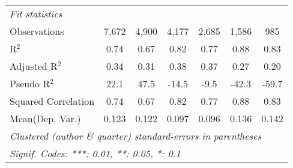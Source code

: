 \begin{tabular}{lcccccc}
   \midrule
   \emph{Fit statistics}\\
   Observations                                               & 7,672   & 4,900        & 4,177        & 2,685        & 1,586   & 985\\  
   R$^2$                                                      & 0.74    & 0.67         & 0.82         & 0.77         & 0.88    & 0.83\\  
   Adjusted R$^2$                                             & 0.34    & 0.31         & 0.38         & 0.37         & 0.27    & 0.20\\  
   Pseudo R$^2$                                               & 22.1    & 47.5         & -14.5        & -9.5         & -42.3   & -59.7\\  
   Squared Correlation                                        & 0.74    & 0.67         & 0.82         & 0.77         & 0.88    & 0.83\\  
Mean(Dep. Var.) & 0.123 & 0.122 & 0.097 & 0.096 & 0.136 & 0.142 \\
   \midrule \midrule
   \multicolumn{7}{l}{\emph{Clustered (author \& quarter) standard-errors in parentheses}}\\
   \multicolumn{7}{l}{\emph{Signif. Codes: ***: 0.01, **: 0.05, *: 0.1}}\\
\end{tabular}
\par\endgroup
